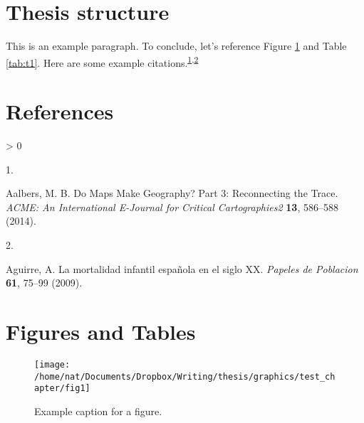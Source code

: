 \documentclass[
]{article}
\newlength{\cslhangindent}
\newlength{\csllabelwidth}
\newenvironment{CSLReferences}[2] %
 {%
  \setlength{\parindent}{0pt}
  \ifodd #1 \everypar{\setlength{\hangindent}{\cslhangindent}}\ignorespaces\fi
  \ifnum #2 > 0
  \setlength{\parskip}{#2\baselineskip}
  \fi
 }%
 {}
\newcommand{\CSLLeftMargin}[1]{\parbox[t]{\csllabelwidth}{#1}}
\newcommand{\CSLRightInline}[1]{\parbox[t]{\linewidth - \csllabelwidth}{#1}\break}
\begin{document}
\lipsum[5-12]

\hypertarget{thesis-structure}{%
\section{Thesis structure}\label{thesis-structure}}

\lipsum[1-3]

This is an example paragraph. To conclude, let's reference Figure \ref{fig:fig1} and Table \ref{tab:t1}. Here are some example citations.\textsuperscript{\protect\hyperlink{ref-Aalbers}{1},\protect\hyperlink{ref-Aguirre2009}{2}}

\hypertarget{references}{%
\section{References}\label{references}}

\hypertarget{refs}{}
\begin{CSLReferences}{0}{0}
\leavevmode\hypertarget{ref-Aalbers}{}%
\CSLLeftMargin{1. }
\CSLRightInline{Aalbers, M. B. {Do Maps Make Geography? Part 3: Reconnecting the Trace}. \emph{ACME: An International E-Journal for Critical Cartographies2} \textbf{13}, 586--588 (2014).}

\leavevmode\hypertarget{ref-Aguirre2009}{}%
\CSLLeftMargin{2. }
\CSLRightInline{Aguirre, A. {La mortalidad infantil espa{ñ}ola en el siglo XX}. \emph{Papeles de Poblacion} \textbf{61}, 75--99 (2009).}

\end{CSLReferences}

\newpage

\hypertarget{figures-and-tables}{%
\section{Figures and Tables}\label{figures-and-tables}}

\begin{figure}[!ht]

{\centering \texttt{[image: /home/nat/Documents/Dropbox/Writing/thesis/graphics/test\_chapter/fig1]} 

}

\caption{Example caption for a figure.}\label{fig:fig1}
\end{figure}
\newpage
\end{document}
